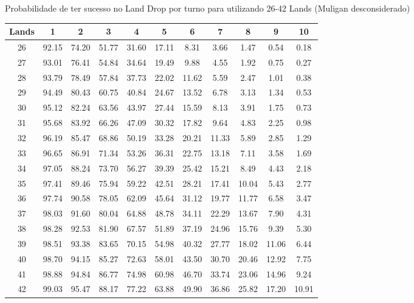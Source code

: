 

Probabilidade de ter sucesso no Land Drop por turno para utilizando 26-42 Lands (Muligan desconsiderado)
\begin{center}
\begin{tabular}{|c||c|c|c|c|c|c|c|c|c|c||} \hline
    
    Lands & 1 & 2 & 3 & 4 & 5 & 6 & 7 & 8 & 9 & 10 \\ \hline
    26 & 92.15 & 74.20 & 51.77 & 31.60 & 17.11 & 8.31 & 3.66 & 1.47 & 0.54 & 0.18 \\ 
    27 & 93.01 & 76.41 & 54.84 & 34.64 & 19.49 & 9.88 & 4.55 & 1.92 & 0.75 & 0.27 \\ 
    28 & 93.79 & 78.49 & 57.84 & 37.73 & 22.02 & 11.62 & 5.59 & 2.47 & 1.01 & 0.38 \\ 
    29 & 94.49 & 80.43 & 60.75 & 40.84 & 24.67 & 13.52 & 6.78 & 3.13 & 1.34 & 0.53 \\ 
    30 & 95.12 & 82.24 & 63.56 & 43.97 & 27.44 & 15.59 & 8.13 & 3.91 & 1.75 & 0.73 \\ 
    31 & 95.68 & 83.92 & 66.26 & 47.09 & 30.32 & 17.82 & 9.64 & 4.83 & 2.25 & 0.98 \\ 
    32 & 96.19 & 85.47 & 68.86 & 50.19 & 33.28 & 20.21 & 11.33 & 5.89 & 2.85 & 1.29 \\ 
    33 & 96.65 & 86.91 & 71.34 & 53.26 & 36.31 & 22.75 & 13.18 & 7.11 & 3.58 & 1.69 \\ 
    34 & 97.05 & 88.24 & 73.70 & 56.27 & 39.39 & 25.42 & 15.21 & 8.49 & 4.43 & 2.18 \\ 
    35 & 97.41 & 89.46 & 75.94 & 59.22 & 42.51 & 28.21 & 17.41 & 10.04 & 5.43 & 2.77 \\ 
    36 & 97.74 & 90.58 & 78.05 & 62.09 & 45.64 & 31.12 & 19.77 & 11.77 & 6.58 & 3.47 \\ 
    37 & 98.03 & 91.60 & 80.04 & 64.88 & 48.78 & 34.11 & 22.29 & 13.67 & 7.90 & 4.31 \\ 
    38 & 98.28 & 92.53 & 81.90 & 67.57 & 51.89 & 37.19 & 24.96 & 15.76 & 9.39 & 5.30 \\ 
    39 & 98.51 & 93.38 & 83.65 & 70.15 & 54.98 & 40.32 & 27.77 & 18.02 & 11.06 & 6.44 \\ 
    40 & 98.70 & 94.15 & 85.27 & 72.63 & 58.01 & 43.50 & 30.70 & 20.46 & 12.92 & 7.75 \\ 
    41 & 98.88 & 94.84 & 86.77 & 74.98 & 60.98 & 46.70 & 33.74 & 23.06 & 14.96 & 9.24 \\ 
    42 & 99.03 & 95.47 & 88.17 & 77.22 & 63.88 & 49.90 & 36.86 & 25.82 & 17.20 & 10.91 \\ \hline \end{tabular}
\end{center}


